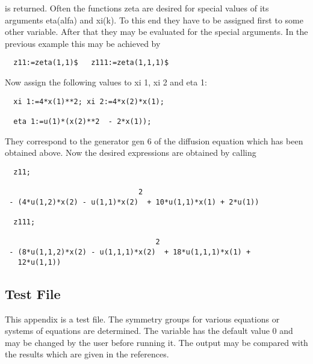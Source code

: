 is returned. Often the functions zeta are desired for special values
of its arguments eta(alfa) and xi(k). To this end they have to be
assigned first to some other variable. After that they may be
evaluated for the special arguments. In the previous example this may
be achieved by

\begin{verbatim}
  z11:=zeta(1,1)$   z111:=zeta(1,1,1)$
\end{verbatim}

Now assign the following values to xi 1, xi 2 and eta 1:

\begin{verbatim}
  xi 1:=4*x(1)**2; xi 2:=4*x(2)*x(1);

  eta 1:=u(1)*(x(2)**2  - 2*x(1));
\end{verbatim}

They correspond to the generator gen 6 of the diffusion equation which
has been obtained above. Now the desired expressions are obtained by
calling

\begin{verbatim}
  z11;

                               2
 - (4*u(1,2)*x(2) - u(1,1)*x(2)  + 10*u(1,1)*x(1) + 2*u(1))

  z111;

                                   2
 - (8*u(1,1,2)*x(2) - u(1,1,1)*x(2)  + 18*u(1,1,1)*x(1) +
   12*u(1,1))
\end{verbatim}


\subsection{Test File}

This appendix is a test file. The symmetry groups for various
equations or systems of equations are determined. The variable 
has the default value 0 and may be changed by the user before running
it. The output may be compared with the results which are given in the
references.


